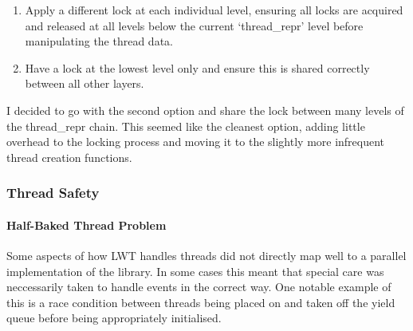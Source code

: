 \documentclass[12pt,twoside,notitlepage]{report}
\begin{document}
\begin{enumerate}
\item Apply a different lock at each individual level, ensuring all locks are acquired and released at all levels below the current `thread\_repr' level before manipulating the thread data.
\item Have a lock at the lowest level only and ensure this is shared correctly between all other layers.
\end{enumerate}

I decided to go with the second option and share the lock between many levels of the thread\_repr chain. This seemed like the cleanest option, adding little overhead to the locking process and moving it to the slightly more infrequent
thread creation functions.

%
%

%
%
\subsubsection{Thread Safety}
\label{subsubsec:thread_safety}
%
%

\paragraph{Half-Baked Thread Problem}
\label{para:half-baked_thread_problem}
%
%
Some aspects of how LWT handles threads did not directly map well to a parallel implementation of the library. In some cases this meant that special care was neccessarily taken to handle events in the correct way. One notable example
of this is a race condition between threads being placed on and taken off the yield queue before being appropriately initialised.
\end{document}
